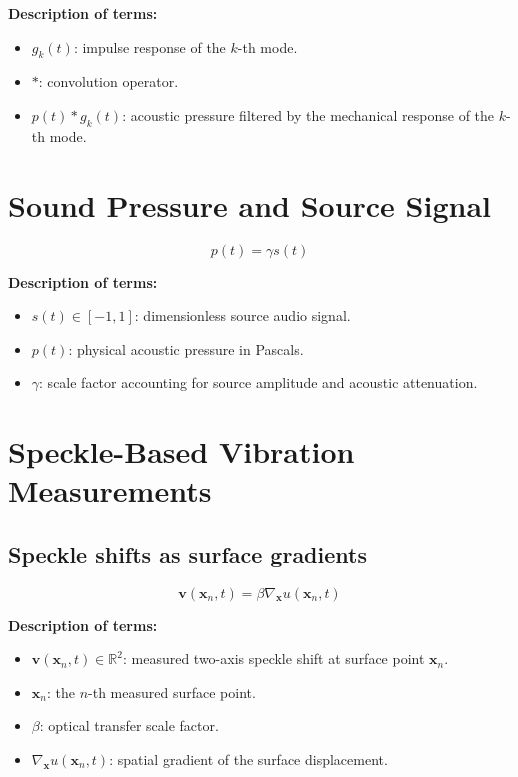 \documentclass[11pt]{article}
\begin{document}
\textbf{Description of terms:}

\begin{itemize}
    \item $g_k(t)$: impulse response of the $k$-th mode.
    \item $*$: convolution operator.
    \item $p(t) * g_k(t)$: acoustic pressure filtered by the mechanical response of the $k$-th mode.
\end{itemize}

\section{Sound Pressure and Source Signal}

\begin{equation}
p(t)
=
\gamma s(t)
\end{equation}

\textbf{Description of terms:}

\begin{itemize}
    \item $s(t) \in [-1,1]$: dimensionless source audio signal.
    \item $p(t)$: physical acoustic pressure in Pascals.
    \item $\gamma$: scale factor accounting for source amplitude and acoustic attenuation.
\end{itemize}

\section{Speckle-Based Vibration Measurements}

\subsection{Speckle shifts as surface gradients}

\begin{equation}
\bm{v}(\bm{x}_n,t)
=
\beta \nabla_{\bm{x}} u(\bm{x}_n,t)
\end{equation}

\textbf{Description of terms:}

\begin{itemize}
    \item $\bm{v}(\bm{x}_n,t) \in \mathbb{R}^2$: measured two-axis speckle shift at surface point $\bm{x}_n$.
    \item $\bm{x}_n$: the $n$-th measured surface point.
    \item $\beta$: optical transfer scale factor.
    \item $\nabla_{\bm{x}} u(\bm{x}_n,t)$: spatial gradient of the surface displacement.
\end{itemize}
\end{document}
